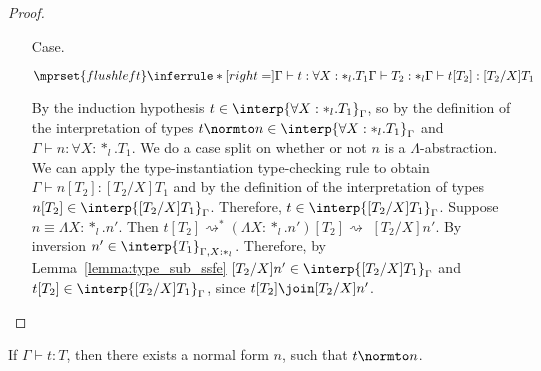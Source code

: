 \begin{proof}
\begin{itemize}
\item[Case.]\ \\
  \begin{center}
    \begin{math}
      $$\mprset{flushleft}
      \inferrule* [right=] {
        \Gamma \vdash t:\forall X:*_l.T_1
        \\
        \Gamma \vdash T_2:*_l
      }{\Gamma \vdash t[T_2]: [T_2/X]T_1}
    \end{math}
  \end{center}
  By the induction hypothesis $t \in \interp{\forall X:*_l.T_1}_\Gamma$, so by the 
  definition of the interpretation of types 
  $t \normto n \in \interp{\forall X:*_l.T_1}_\Gamma$ and
  $\Gamma \vdash n:\forall X:*_l.T_1$.  We do a case 
  split on whether or not $n$ is a $\Lambda$-abstraction. We can apply the
  type-instantiation type-checking rule to obtain 
  $\Gamma \vdash n[T_2]:[T_2/X]T_1$ and by the 
  definition of the interpretation of types 
  $n[T_2] \in \interp{[T_2/X]T_1}_\Gamma$. Therefore, 
  $t \in \interp{[T_2/X]T_1}_\Gamma$.  Suppose $n \equiv \Lambda X:*_l.n'$.  
  Then 
  $t[T_2] \rightsquigarrow^{*} (\Lambda X:*_l.n')[T_2] \rightsquigarrow $
  $ [T_2/X]n'$.  By inversion
  $n' \in \interp{T_1}_{\Gamma,X:*_l}$. Therefore, by
  Lemma~\ref{lemma:type_sub_ssfe} $[T_2/X]n' \in \interp{[T_2/X]T_1}_{\Gamma}$ and
  $t[T_2] \in \interp{[T_2/X]T_1}_{\Gamma}$, since $t[T_2] \join [T_2/X]n'$.
\end{itemize}
\end{proof}
\begin{corollary}[Normalization]
  If $\Gamma \vdash t:T$, then there exists a normal form $n$, such
  that $t \normto n$.
\end{corollary}

